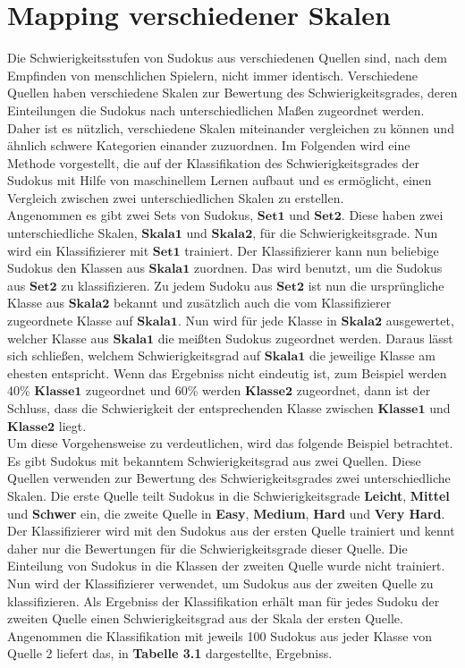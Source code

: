 \newpage
\section{Mapping verschiedener Skalen}
\label{Mapping}
Die Schwierigkeitsstufen von Sudokus aus verschiedenen Quellen sind, nach dem Empfinden von menschlichen Spielern, nicht immer identisch. Verschiedene Quellen haben verschiedene Skalen zur Bewertung des Schwierigkeitsgrades, deren Einteilungen die Sudokus nach unterschiedlichen Maßen zugeordnet werden. Daher ist es nützlich, verschiedene Skalen miteinander vergleichen zu können und ähnlich schwere Kategorien einander zuzuordnen. Im Folgenden wird eine Methode vorgestellt, die auf der Klassifikation des Schwierigkeitsgrades der Sudokus mit Hilfe von maschinellem Lernen aufbaut und es ermöglicht, einen Vergleich zwischen zwei unterschiedlichen Skalen zu erstellen.\\
Angenommen es gibt zwei Sets von Sudokus, $\mathbf{Set 1}$ und $\mathbf{Set 2}$. Diese haben zwei unterschiedliche Skalen, $\mathbf{Skala 1}$ und $\mathbf{Skala 2}$, für die Schwierigkeitsgrade. Nun wird ein Klassifizierer mit $\mathbf{Set 1}$ trainiert. Der Klassifizierer kann nun beliebige Sudokus den Klassen aus $\mathbf{Skala 1}$ zuordnen. Das wird benutzt, um die Sudokus aus $\mathbf{Set 2}$ zu klassifizieren. Zu jedem Sudoku aus $\mathbf{Set 2}$ ist nun die ursprüngliche Klasse aus $\mathbf{Skala 2}$ bekannt und zusätzlich auch die vom Klassifizierer zugeordnete Klasse auf $\mathbf{Skala 1}$. Nun wird für jede Klasse in $\mathbf{Skala 2}$ ausgewertet, welcher Klasse aus $\mathbf{Skala 1}$ die meißten Sudokus zugeordnet werden. Daraus lässt sich schließen, welchem Schwierigkeitsgrad auf $\mathbf{Skala 1}$ die jeweilige Klasse am ehesten entspricht. Wenn das Ergebniss nicht eindeutig ist, zum Beispiel werden 40\% $\mathbf{Klasse 1}$ zugeordnet und 60\% werden $\mathbf{Klasse 2}$ zugeordnet, dann ist der Schluss, dass die Schwierigkeit der entsprechenden Klasse zwischen $\mathbf{Klasse 1}$ und $\mathbf{Klasse 2}$ liegt.\\
Um diese Vorgehensweise zu verdeutlichen, wird das folgende Beispiel betrachtet. Es gibt Sudokus mit bekanntem Schwierigkeitsgrad aus zwei Quellen. Diese Quellen verwenden zur Bewertung des Schwierigkeitsgrades zwei unterschiedliche Skalen. Die erste Quelle teilt Sudokus in die Schwierigkeitsgrade \textbf{Leicht}, \textbf{Mittel} und \textbf{Schwer} ein, die zweite Quelle in \textbf{Easy}, \textbf{Medium}, \textbf{Hard} und \textbf{Very Hard}. Der Klassifizierer wird mit den Sudokus aus der ersten Quelle trainiert und kennt daher nur die Bewertungen für die Schwierigkeitsgrade dieser Quelle. Die Einteilung von Sudokus in die Klassen der zweiten Quelle wurde nicht trainiert. Nun wird der Klassifizierer verwendet, um Sudokus aus der zweiten Quelle zu klassifizieren. Als Ergebniss der Klassifikation erhält man für jedes Sudoku der zweiten Quelle einen Schwierigkeitsgrad aus der Skala der ersten Quelle. Angenommen die Klassifikation mit jeweils 100 Sudokus aus jeder Klasse von Quelle 2 liefert das, in \textbf{Tabelle 3.1} dargestellte, Ergebniss.\\
